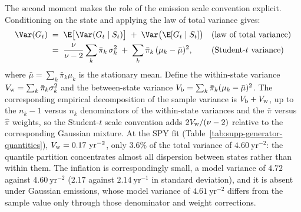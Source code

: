 The second moment makes the role of the emission scale convention
explicit. Conditioning on the state and applying the law of total
variance gives:
\begin{align}
  \Var(G_t)
   &\;=\; \E\big[\Var(G_t \mid S_t)\big]
     \;+\; \Var\big(\E[G_t \mid S_t]\big)
     && \text{(law of total variance)} \notag \\
   &\;=\; \frac{\nu}{\nu - 2} \sum_k \bar\pi_k\, \sigma_k^2
     \;+\; \sum_k \bar\pi_k\, (\mu_k - \bar\mu)^2,
     && \text{(Student-$t$ variance)}
  \label{eq:supp-variance}
\end{align}
where $\bar\mu = \sum_k \bar\pi_k \mu_k$ is the stationary mean.
Define the within-state variance $V_{\rm w} = \sum_k \bar\pi_k
\sigma_k^2$ and the between-state variance $V_{\rm b} = \sum_k
\bar\pi_k (\mu_k - \bar\mu)^2$. The corresponding empirical
decomposition of the sample variance is $V_{\rm b} + V_{\rm w}$, up to
the $n_k - 1$ versus $n_k$ denominators of the within-state variances
and the $\bar\pi$ versus $\hat\pi$ weights, so the Student-$t$ scale convention adds
$2 V_{\rm w} / (\nu - 2)$ relative to the corresponding Gaussian mixture. At the SPY fit
(Table~\ref{tab:supp-generator-quantities}),
$V_{\rm w} = 0.17~\mathrm{yr}^{-2}$, only $3.6\%$ of the total
variance of $4.60~\mathrm{yr}^{-2}$: the quantile partition
concentrates almost all dispersion between states rather than within
them. The inflation is correspondingly small, a model variance of
$4.72$ against $4.60~\mathrm{yr}^{-2}$ ($2.17$ against
$2.14~\mathrm{yr}^{-1}$ in standard deviation), and it is absent under
Gaussian emissions, whose model variance of $4.61~\mathrm{yr}^{-2}$
differs from the sample value only through those denominator and
weight corrections.

